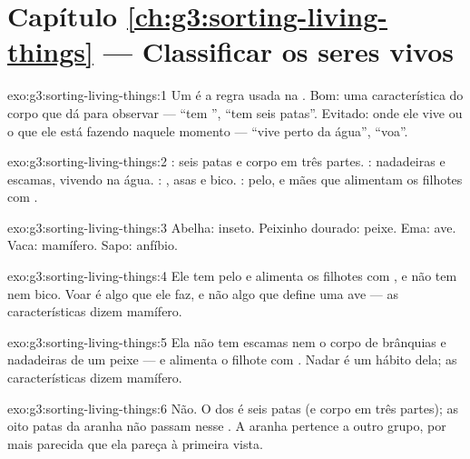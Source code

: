 \section*{Capítulo \ref{ch:g3:sorting-living-things} --- Classificar os seres vivos}

\begin{solution}{exo:g3:sorting-living-things:1}
Um  é a regra usada na . Bom: uma
característica do corpo que dá para observar --- ``tem '',
``tem seis patas''. Evitado: onde ele vive ou o que ele está fazendo
naquele momento --- ``vive perto da água'', ``voa''.
\end{solution}

\begin{solution}{exo:g3:sorting-living-things:2}
: seis patas e corpo em três partes. : nadadeiras e
escamas, vivendo na água. : , asas e bico. : pelo,
e mães que alimentam os filhotes com .
\end{solution}

\begin{solution}{exo:g3:sorting-living-things:3}
Abelha: inseto. Peixinho dourado: peixe. Ema: ave. Vaca: mamífero.
Sapo: anfíbio.
\end{solution}

\begin{solution}{exo:g3:sorting-living-things:4}
Ele tem pelo e alimenta os filhotes com , e não tem  nem
bico. Voar é algo que ele faz, e não algo que define uma ave --- as
características dizem mamífero.
\end{solution}

\begin{solution}{exo:g3:sorting-living-things:5}
Ela não tem escamas nem o corpo de brânquias e nadadeiras de um
peixe --- e alimenta o filhote com . Nadar é um hábito dela; as
características dizem mamífero.
\end{solution}

\begin{solution}{exo:g3:sorting-living-things:6}
Não. O  dos  é seis patas (e corpo em três partes);
as oito patas da aranha não passam nesse . A aranha pertence
a outro grupo, por mais parecida que ela pareça à primeira vista.
\end{solution}

